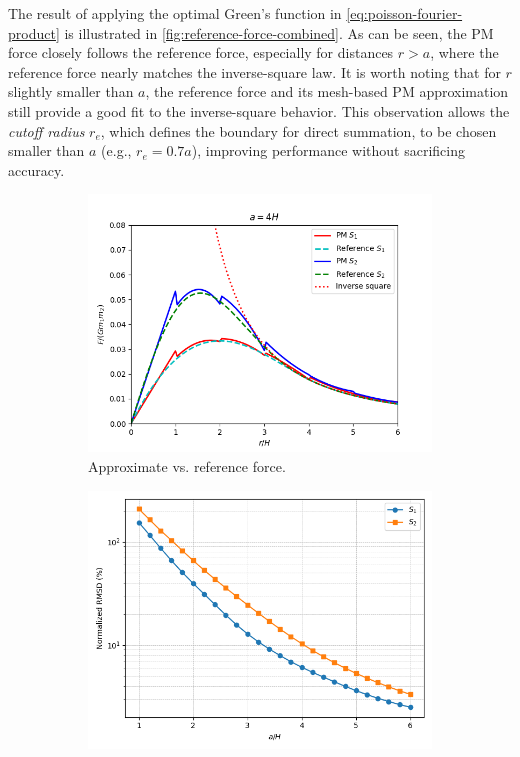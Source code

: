 The result of applying the optimal Green's function in \autoref{eq:poisson-fourier-product} is illustrated in \autoref{fig:reference-force-combined}.
As can be seen, the PM force closely follows the reference force, especially for distances \( r > a \), where the reference force nearly matches the inverse-square law.
It is worth noting that for \( r \) slightly smaller than \( a \), the reference force and its mesh-based PM approximation still provide a good fit to the inverse-square behavior.
This observation allows the \textit{cutoff radius} \( r_e \), which defines the boundary for direct summation, to be chosen smaller than \( a \) (e.g., \( r_e = 0.7a \)), improving performance without sacrificing accuracy.
\begin{figure}[htp]
    \centering
    \begin{subfigure}[b]{0.48\textwidth}
        \centering
        \includegraphics[width=\textwidth]{chapters/p3m-method/img/s1-vs-s2.png}
        \caption{Approximate vs. reference force.}
        \label{fig:reference-force-approx-sub}
    \end{subfigure}
    \hfill
    \begin{subfigure}[b]{0.48\textwidth}
        \centering
        \includegraphics[width=\textwidth]{chapters/p3m-method/img/s1-vs-s2-nrmsd.png}

\end{subfigure}
\end{figure}
